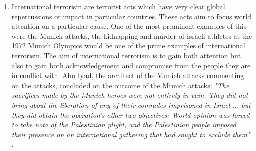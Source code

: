 \begin{enumerate}
\item International terrorism are terrorist acts which have very clear global repercussions or impact in particular countries. These acts aim to focus world attention on a particular cause. One of the most prominent examples of this were the Munich attacks, the kidnapping and murder of Israeli athletes at the 1972 Munich Olympics would be one of the prime examples of international terrorism. The aim of international terrorism is to gain both attention but also to gain both acknowledgement and compromise from the people they are in conflict with. Abu Iyad, the architect of the Munich attacks commenting on the attacks, concluded on the outcome of the Munich attacks: \textit{"The sacrifices made by the Munich heroes were not entirely in vain. They did not bring about the liberation of any of their comrades imprisoned in Israel ... but they did obtain the operation's other two objectives: World opinion was forced to take note of the Palestinian plight, and the Palestinian people imposed their presence on an international gathering that had sought to exclude them"} \citep{iyad1981my}.
\end{enumerate}

